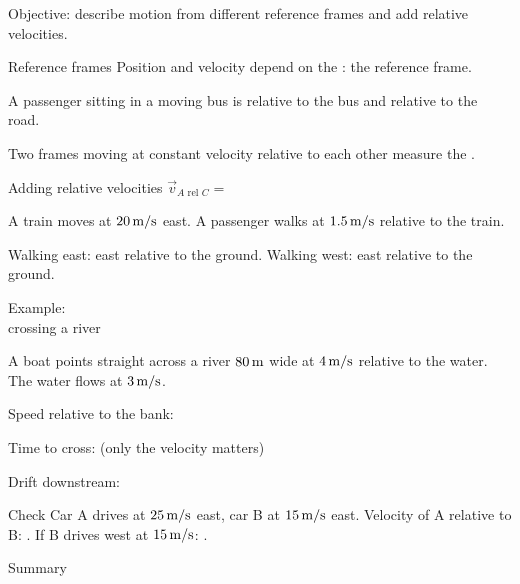 \begin{center}\textsf{\small\color{apgrey}Objective: describe motion from different reference frames and add relative velocities.}\end{center}
\begin{nrow}{Reference frames}
Position and velocity depend on the : the reference frame.\par
A passenger sitting in a moving bus is  relative to the bus and  relative to the road.\par
Two frames moving at constant velocity relative to each other measure the .
\end{nrow}
\begin{nrow}{Adding relative velocities}
$\vec v_{A\text{ rel }C}=$ \par\smallskip
A train moves at $20\,\mathrm{m/s}$ east. A passenger walks at $1.5\,\mathrm{m/s}$ relative to the train.\par
Walking east: \fillin{$21.5\ms$} east relative to the ground. \quad Walking west: \fillin{$18.5\ms$} east relative to the ground.
\end{nrow}
\begin{nrow}{Example:\\ crossing a river}
\begin{minipage}[t]{0.55\linewidth}
A boat points straight across a river $80\,\mathrm{m}$ wide at $4\,\mathrm{m/s}$ relative to the water. The water flows at $3\,\mathrm{m/s}$.\par
Speed relative to the bank: \par
Time to cross:  (only the  velocity matters)\par
Drift downstream: 
\end{minipage}\hfill
\begin{minipage}[t]{0.4\linewidth}\vspace{0pt}
\end{minipage}
\end{nrow}
\begin{nrow}{Check}
Car A drives at $25\,\mathrm{m/s}$ east, car B at $15\,\mathrm{m/s}$ east. Velocity of A relative to B: . If B drives west at $15\,\mathrm{m/s}$: .
\end{nrow}
\begin{nrow}{Summary}
\else\vspace{2.4cm}\fi
\end{nrow}

